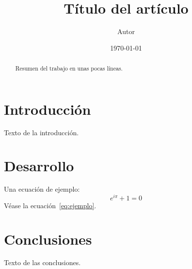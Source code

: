 \documentclass[11pt,a4paper]{article}
\title{Título del artículo}
\author{Autor}
\date{\today}
\begin{document}
\maketitle

\begin{abstract}
Resumen del trabajo en unas pocas líneas.
\end{abstract}

\section{Introducción}\label{sec:intro}
Texto de la introducción.

\section{Desarrollo}\label{sec:desarrollo}
Una ecuación de ejemplo:
\begin{equation}\label{eq:ejemplo}
  e^{i\pi} + 1 = 0
\end{equation}
Véase la ecuación~\eqref{eq:ejemplo}.

\section{Conclusiones}\label{sec:conclusiones}
Texto de las conclusiones.
\end{document}
